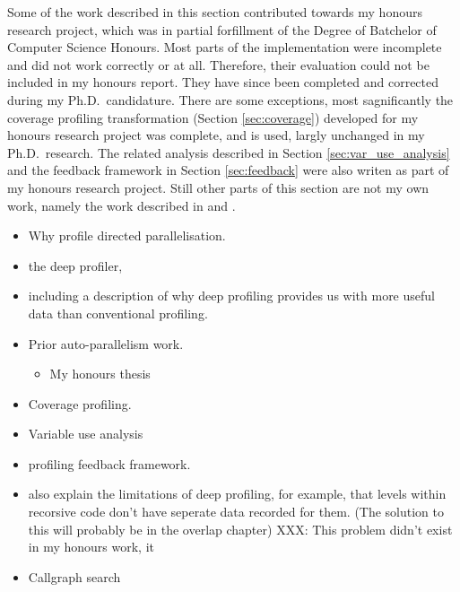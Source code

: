 

Some of the work described in this section contributed towards my honours research project,
which was in partial forfillment of the Degree of Batchelor of Computer Science
Honours.
Most parts of the implementation were incomplete and did not work correctly or
at all.
Therefore,
their evaluation could not be included in my honours report.
They have since been completed and corrected during my Ph.D.\ candidature.
There are some exceptions,
most sagnificantly the coverage profiling transformation (Section \ref{sec:coverage})
developed for my honours research project was complete, and is used, largly
unchanged in my Ph.D.\ research.
The related analysis described in Section \ref{sec:var_use_analysis}
and the feedback framework in Section \ref{sec:feedback}
were also writen as part of my honours research project.
Still other parts of this section are not my own work,
namely the work described in
\citet{conway:2001:mercury-deep} and
\citet{tannier:2007:parallel_mercury}.


\begin{itemize}
\item Why profile directed parallelisation.
\item the deep profiler,
\item including a description of why deep profiling provides us with
      more useful data than conventional profiling.
\item Prior auto-parallelism work.
\begin{itemize}
    \item My honours thesis
\end{itemize}
\item Coverage profiling.
\item Variable use analysis
\item profiling feedback framework.
\end{itemize}

\begin{itemize}
\item also explain the limitations of deep profiling,
      for example, that levels within recorsive code don't have seperate
      data recorded for them.
      (The solution to this will probably be in the overlap chapter)
      XXX: This problem didn't exist in my honours work, it
\item Callgraph search
\end{itemize}

